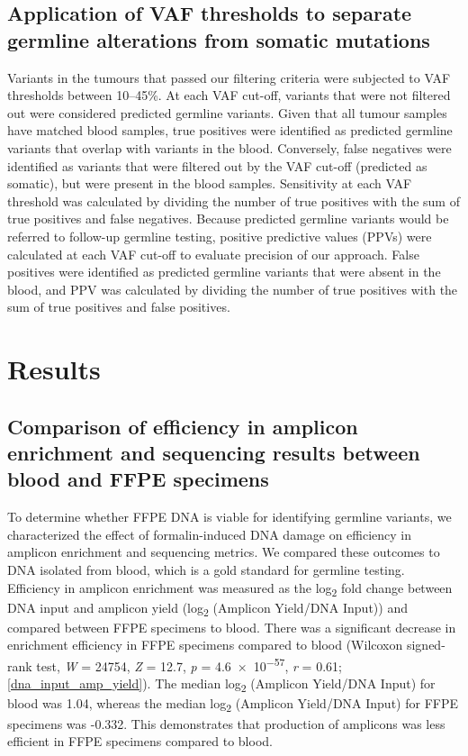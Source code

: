 \documentclass{bmcart}
\begin{document}
\subsection*{Application of VAF thresholds to separate germline alterations from somatic mutations}

Variants in the tumours that passed our filtering criteria were subjected to VAF thresholds between 10--45\%. At each VAF cut-off, variants that were not filtered out were considered predicted germline variants. Given that all tumour samples have matched blood samples, true positives were identified as predicted germline variants that overlap with variants in the blood. Conversely, false negatives were identified as variants that were filtered out by the VAF cut-off (predicted as somatic), but were present in the blood samples. Sensitivity at each VAF threshold was calculated by dividing the number of true positives with the sum of true positives and false negatives. Because predicted germline variants would be referred to follow-up germline testing, positive predictive values (PPVs) were calculated at each VAF cut-off to evaluate precision of our approach. False positives were identified as predicted germline variants that were absent in the blood, and PPV was calculated by dividing the number of true positives with the sum of true positives and false positives.

\section*{Results}

\subsection*{Comparison of efficiency in amplicon enrichment and sequencing results between blood and FFPE specimens}

To determine whether FFPE DNA is viable for identifying germline variants, we characterized the effect of formalin-induced DNA damage on efficiency in amplicon enrichment and sequencing metrics. We compared these outcomes to DNA isolated from blood, which is a gold standard for germline testing. Efficiency in amplicon enrichment was measured as the log\textsubscript{2} fold change between DNA input and amplicon yield (log\textsubscript{2} (Amplicon Yield/DNA Input)) and compared between FFPE specimens to blood. There was a significant decrease in enrichment efficiency in FFPE specimens compared to blood (Wilcoxon signed-rank test, \textit{W} = 24754, \textit{Z} = 12.7, \textit{p} = \num{4.6e-57}, \textit{r} = 0.61; \autoref{dna_input_amp_yield}). The median log\textsubscript{2} (Amplicon Yield/DNA Input) for blood was 1.04, whereas the median log\textsubscript{2} (Amplicon Yield/DNA Input) for FFPE specimens was -0.332. This demonstrates that production of amplicons was less efficient in FFPE specimens compared to blood.
\end{document}
